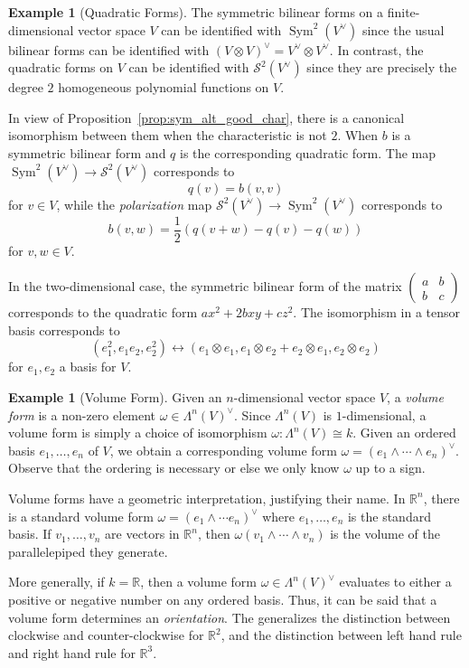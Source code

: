 \documentclass[12pt]{article}
\theoremstyle{plain}
\theoremstyle{definition}
\newtheorem{example}[theorem]{Example}
\theoremstyle{remark}
\numberwithin{equation}{section}
\begin{document}
\begin{example}[Quadratic Forms]
The symmetric bilinear forms on a finite-dimensional vector space $V$
can be identified with $\operatorname{Sym}^2(V^\vee)$ since the usual
bilinear forms can be identified with
$(V \otimes V)^\vee=V^\vee \otimes V^\vee$.
In contrast, the quadratic forms on $V$ can be identified with
$\mathcal{S}^2(V^\vee)$ since they are precisely the degree $2$
homogeneous polynomial functions on $V$.

In view of Proposition~\ref{prop:sym_alt_good_char},
there is a canonical isomorphism between them when the characteristic is
not $2$.  When $b$ is a
symmetric bilinear form and $q$ is the corresponding quadratic form.
The map $\operatorname{Sym}^2(V^\vee) \to \mathcal{S}^2(V^\vee)$
corresponds to
\[
q(v) = b(v,v)
\]
for $v\in V$, while the \emph{polarization} map
$\mathcal{S}^2(V^\vee) \to \operatorname{Sym}^2(V^\vee)$
corresponds to
\[
b(v,w) = \frac{1}{2}\left( q(v+w)-q(v)-q(w)\right)
\]
for $v,w \in V$.

In the two-dimensional case,
the symmetric bilinear form of the matrix
$\begin{pmatrix} a & b\\ b&c \end{pmatrix}$ corresponds to the quadratic
form $ax^2+2bxy+cz^2$.  The isomorphism in a tensor basis corresponds to
\[
(e_1^2, e_1e_2, e_2^2) \leftrightarrow
(e_1 \otimes e_1, e_1 \otimes e_2 + e_2 \otimes e_1, e_2 \otimes e_2)
\]
for $e_1, e_2$ a basis for $V$.
\end{example}

\begin{example}[Volume Form]
Given an $n$-dimensional vector space $V$,
a \emph{volume form} is a non-zero element $\omega \in \Lambda^n(V)^\vee$.
Since $\Lambda^n(V)$ is $1$-dimensional, a volume form is simply a
choice of isomorphism $\omega : \Lambda^n(V) \cong k$.
Given an ordered basis $e_1,\ldots, e_n$ of $V$,
we obtain a corresponding volume form
$\omega = (e_1 \wedge \cdots \wedge e_n)^\vee$.
Observe that the ordering is necessary or else we only know $\omega$
up to a sign.

Volume forms have a geometric interpretation, justifying their name.
In $\mathbb{R}^n$, there is a standard volume form
$\omega=(e_1\wedge \cdots e_n)^\vee$ where
$e_1,\ldots,e_n$ is the standard basis.
If $v_1,\ldots,v_n$ are vectors in $\mathbb{R}^n$,
then $\omega(v_1\wedge \cdots \wedge v_n)$ is the volume of
the parallelepiped they generate. 

More generally, if $k=\mathbb{R}$,
then a volume form $\omega \in \Lambda^n(V)^\vee$
evaluates to either a positive or negative number on any ordered basis.
Thus, it can be said that a volume form determines an
\emph{orientation}.
The generalizes the distinction between clockwise and counter-clockwise
for $\mathbb{R}^2$, and the distinction between left hand rule and right
hand rule for $\mathbb{R}^3$.
\end{example}
\end{document}
